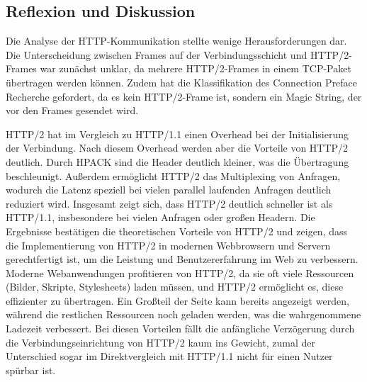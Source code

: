 \subsection{Reflexion und Diskussion}

Die Analyse der HTTP-Kommunikation stellte wenige Herausforderungen dar.
Die Unterscheidung zwischen Frames auf der Verbindungsschicht und HTTP/2-Frames war zunächst unklar, da mehrere HTTP/2-Frames in einem TCP-Paket übertragen werden können.
Zudem hat die Klassifikation des Connection Preface Recherche gefordert, da es kein HTTP/2-Frame ist, sondern ein Magic String, der vor den Frames gesendet wird.

HTTP/2 hat im Vergleich zu HTTP/1.1 einen Overhead bei der Initialisierung der Verbindung.
Nach diesem Overhead werden aber die Vorteile von HTTP/2 deutlich.
Durch HPACK sind die Header deutlich kleiner, was die Übertragung beschleunigt.
Außerdem ermöglicht HTTP/2 das Multiplexing von Anfragen, wodurch die Latenz speziell bei vielen parallel laufenden Anfragen deutlich reduziert wird.
Insgesamt zeigt sich, dass HTTP/2 deutlich schneller ist als HTTP/1.1, insbesondere bei vielen Anfragen oder großen Headern.
Die Ergebnisse bestätigen die theoretischen Vorteile von HTTP/2 und zeigen, dass die Implementierung von HTTP/2 in modernen Webbrowsern und Servern gerechtfertigt ist, um die Leistung und Benutzererfahrung im Web zu verbessern.
Moderne Webanwendungen profitieren von HTTP/2, da sie oft viele Ressourcen (Bilder, Skripte, Stylesheets) laden müssen, und HTTP/2 ermöglicht es, diese effizienter zu übertragen.
Ein Großteil der Seite kann bereits angezeigt werden, während die restlichen Ressourcen noch geladen werden, was die wahrgenommene Ladezeit verbessert.
Bei diesen Vorteilen fällt die anfängliche Verzögerung durch die Verbindungseinrichtung von HTTP/2 kaum ins Gewicht, zumal der Unterschied sogar im Direktvergleich mit HTTP/1.1 nicht für einen Nutzer spürbar ist.

